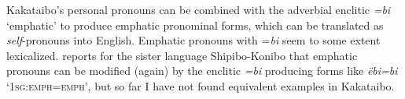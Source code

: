 \documentclass[output=paper,colorlinks,citecolor=brown,modfonts,nonflat]{langscibook}
\begin{document}
\begin{table}
    \caption{Personal pronouns in Kakataibo}
    \label{tab:zariquiey:5}
\end{table}

Kakataibo’s personal pronouns can be combined with the adverbial enclitic \textit{=bi} ‘emphatic’ to produce emphatic pronominal forms, which can be translated as \textit{self}{}-pronouns into English. Emphatic pronouns with =\textit{bi} seem to some extent lexicalized. \citet[188--191]{Valenzuela2003} reports for the sister language Shipibo-Konibo that emphatic pronouns can be modified (again) by the enclitic \textit{=bi} producing forms like \textit{ëbi=bi} ‘\textsc{1sg:emph=emph}’, but so far I have not found equivalent examples in Kakataibo. 
\end{document}
